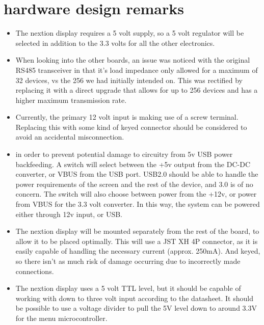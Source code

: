 \documentclass{article}
\begin{document}
     \section{hardware design remarks}
     \begin{itemize}
     	\item The nextion display requires a 5 volt supply, so a 5 volt regulator will be selected in addition to the 3.3 volts
     for all the other electronics.
     
     \item When looking into the other boards, an issue was noticed with the original RS485 transceiver in that it's load impedance only
     allowed for a maximum of 32 devices, vs the 256 we had initially intended on.
     This was rectified by replacing it with a direct upgrade that allows for up to 256 devices and has a higher maximum transmission rate.
     
     \item Currently, the primary 12 volt input is making use of a screw terminal. 
     Replacing this with some kind of keyed connector should be considered to avoid an accidental misconnection.
     
     \item in order to prevent potential damage to circuitry from 5v USB power backfeeding.
     A switch will select between the +5v output from the DC-DC converter, or VBUS from the USB port.
     USB2.0 should be able to handle the power requirements of the screen and the rest of the device, and 3.0 is of no concern.
     The switch will also choose between power from the +12v, or power from VBUS for the 3.3 volt converter.
     In this way, the system can be powered either through 12v input, or USB.
     
     \item The nextion display will be mounted separately from the rest of the board, to allow it to be placed optimally.
     This will use a JST XH 4P connector, as it is easily capable of handling the necessary current (approx. 250mA).
     And keyed, so there isn't as much risk of damage occurring due to incorrectly made connections.
     
     \item The nextion display uses a 5 volt TTL level, but it should be capable of working with down to three volt input according to the datasheet.
     It should be possible to use a voltage divider to pull the 5V level down to around 3.3V for the menu microcontroller.
     

\end{itemize}
\end{document}
